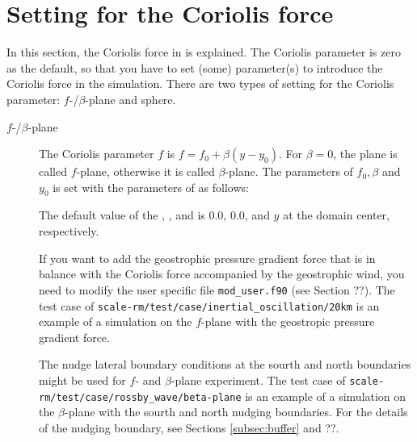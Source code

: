 \section{Setting for the Coriolis force} \label{subsec:coriolis}

In this section, the Coriolis force in \scalerm is explained.
The Coriolis parameter is zero as the default, so that you have to set (some) parameter(s) to introduce the Coriolis force in the simulation.
There are two types of setting for the Coriolis parameter: $f$-/$\beta$-plane and sphere.

\begin{description}
\item[$f$-/$\beta$-plane]
  The Coriolis parameter $f$ is $f=f_0 + \beta (y-y_0)$.
  For $\beta=0$, the plane is called $f$-plane, otherwise it is called $\beta$-plane.
  The parameters of $f_0, \beta$ and $y_0$ is set with the parameters of  as follows:

  The default value of the , , and  is 0.0, 0.0, and $y$ at the domain center, respectively.

  If you want to add the geostrophic pressure gradient force that is in balance with the Coriolis force accompanied by the geostrophic wind, you need to modify the user specific file \verb|mod_user.f90| (see Section ??).
  The test case of \verb|scale-rm/test/case/inertial_oscillation/20km| is an example of a simulation on the $f$-plane with the geostropic pressure gradient force.

  The nudge lateral boundary conditions at the sourth and north boundaries might be used for $f$- and $\beta$-plane experiment.
  The test case of \verb|scale-rm/test/case/rossby_wave/beta-plane| is an example of a simulation on the $\beta$-plane with the sourth and north nudging boundaries.
  For the details of the nudging boundary, see Sections \ref{subsec:buffer} and ??.


\end{description}
